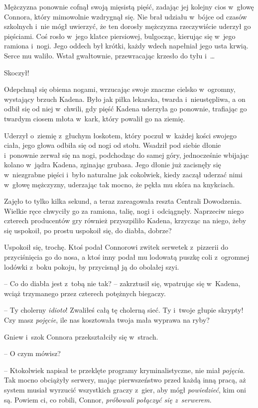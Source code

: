 \documentclass[oneside,polish,11pt,rmheadings]{mwbk}
\begin{document}
Mężczyzna ponownie cofnął swoją mięsistą pięść, zadając jej kolejny cios w~głowę Connora, który mimowolnie wzdrygnął się. Nie brał udziału w~bójce od czasów szkolnych i~nie mógł uwierzyć, że ten dorosły mężczyzna rzeczywiście uderzył go pięściami. Coś rosło w~jego klatce piersiowej, bulgocząc, kierując się w~jego ramiona i~nogi. Jego oddech był krótki, każdy wdech napełniał jego usta krwią. Serce mu waliło. Wstał gwałtownie, przewracając krzesło do tyłu i~\ldots 

Skoczył!

Odepchnął się obiema nogami, wrzucając swoje znaczne cielsko w~ogromny, wystający brzuch Kadena. Było jak piłka lekarska, twarda i~nieustępliwa, a on odbił się od niej w~chwili, gdy pięść Kadena uderzyła go ponownie, trafiając go twardym ciosem młota w~kark, który powalił go na ziemię.

Uderzył o~ziemię z~głuchym łoskotem, który poczuł w~każdej kości swojego ciała, jego głowa odbiła się od nogi od stołu. Wsadził pod siebie dłonie i~ponownie zerwał się na nogi, podchodząc do samej góry, jednocześnie wbijając kolano w~jądra Kadena, zginając grubasa. Jego dłonie już zacisnęły się w~niezgrabne pięści i~było naturalne jak cokolwiek, kiedy zaczął uderzać nimi w~głowę mężczyzny, uderzając tak mocno, że pękła mu skóra na knykciach.

Zajęło to tylko kilka sekund, a teraz zareagowała reszta Centrali Dowodzenia. Wielkie ręce chwyciły go za ramiona, talię, nogi i~odciągnęły. Naprzeciw niego czterech producentów gry również przyszpiliło Kadena, krzycząc na niego, żeby się uspokoił, po prostu uspokoił się, do diabła, dobrze?

Uspokoił się, trochę. Ktoś podał Connorowi zwitek serwetek z~pizzerii do przyciśnięcia go do nosa, a ktoś inny podał mu lodowatą puszkę coli z~ogromnej lodówki z~boku pokoju, by przycisnął ją do obolałej szyi.

-- Co do diabła jest z~tobą nie tak? -- zakrztusił się, wpatrując się w~Kadena, wciąż trzymanego przez czterech potężnych biegaczy.

-- Ty cholerny \textit{idioto}! Zwaliłeś całą tę cholerną sieć. Ty i~twoje głupie skrypty! Czy masz \textit{pojęcie}, ile nas kosztowała twoja mała wyprawa na ryby?

Gniew i~szok Connora przekształciły się w~strach.

-- O czym mówisz? 

-- Ktokolwiek napisał te przeklęte programy kryminalistyczne, nie miał \textit{pojęcia}. Tak mocno obciążyły serwery, mając pierwszeństwo przed każdą inną pracą, aż system musiał wyrzucić wszystkich graczy z~gier, aby mógł \textit{powiedzieć}, kim oni są. Powiem ci, co robili, Connor, \textit{próbowali połączyć się z~serwerem}.
\end{document}
